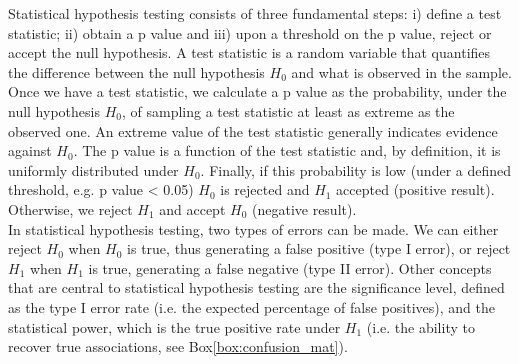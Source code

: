 \vspace{4mm}

Statistical hypothesis testing consists of three fundamental steps: i) define a test statistic; ii) obtain a p value and iii) upon a threshold on the p value, reject or accept the null hypothesis. 
A test statistic is a random variable that quantifies the difference between the null hypothesis $H_0$ and what is observed in the sample. 
Once we have a test statistic, we calculate a p value as the probability, under the null hypothesis $H_0$, of sampling a test statistic at least as extreme as the observed one. 
An extreme value of the test statistic generally indicates evidence against $H_0$.
The p value is a function of the test statistic and, by definition, it is uniformly distributed under $H_0$.
Finally, if this probability is low (under a defined threshold, e.g. p value < 0.05) $H_0$ is rejected and $H_1$ accepted (positive result).
Otherwise, we reject $H_1$ and accept $H_0$ (negative result).\\

In statistical hypothesis testing, two types of errors can be made. 
We can either reject $H_0$ when $H_0$ is true, thus generating a false positive (type I error), or reject $H_1$ when $H_1$ is true, generating a false negative (type II error).
Other concepts that are central to statistical hypothesis testing are the significance level, defined as the type I error rate (i.e. the expected percentage of false positives), and the statistical power, which is the true positive rate under $H_1$ (i.e. the ability to recover true associations, see Box\ref{box:confusion_mat}).


\newpage

